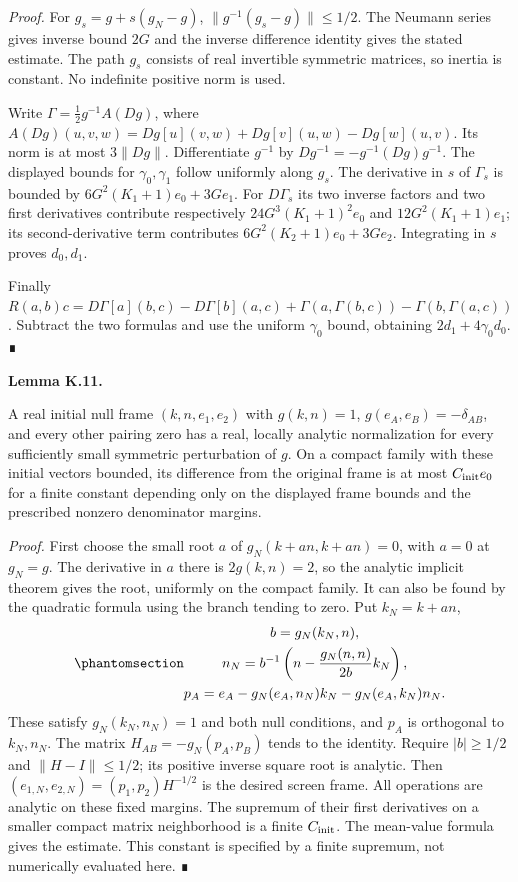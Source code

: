 \documentclass[
  english,
  11pt,
  reqno]{amsart}
\makeatletter
\newcommand{\pandocstatementheading}[1]{%
  \par\addpenalty{\@beginparpenalty}%
  \addvspace{.5\baselineskip plus .2\baselineskip minus .2\baselineskip}%
  {\normalfont\bfseries #1\par}%
  \nobreak\@afterindenttrue\@afterheading
}
\makeatother
\begin{document}
\emph{Proof.} For \(g_s=g+s(g_N-g)\), \(\|g^{-1}(g_s-g)\|\le1/2\). The
Neumann series gives inverse bound \(2G\) and the inverse difference
identity gives the stated estimate. The path \(g_s\) consists of real
invertible symmetric matrices, so inertia is constant. No indefinite
positive norm is used.

Write \(\Gamma=\tfrac12g^{-1}A(Dg)\), where
\(A(Dg)(u,v,w)=Dg[u](v,w)+Dg[v](u,w)-Dg[w](u,v)\). Its norm is at most
\(3\|Dg\|\). Differentiate \(g^{-1}\) by \(Dg^{-1}=-g^{-1}(Dg)g^{-1}\).
The displayed bounds for \(\gamma_0,\gamma_1\) follow uniformly along
\(g_s\). The derivative in \(s\) of \(\Gamma_s\) is bounded by
\(6G^2(K_1+1)e_0+3Ge_1\). For \(D\Gamma_s\) its two inverse factors and
two first derivatives contribute respectively \(24G^3(K_1+1)^2e_0\) and
\(12G^2(K_1+1)e_1\); its second-derivative term contributes
\(6G^2(K_2+1)e_0+3Ge_2\). Integrating in \(s\) proves \(d_0,d_1\).

Finally
\(R(a,b)c=D\Gamma[a](b,c)-D\Gamma[b](a,c)+\Gamma(a,\Gamma(b,c))-\Gamma(b,\Gamma(a,c))\).
Subtract the two formulas and use the uniform \(\gamma_0\) bound,
obtaining \(2d_1+4\gamma_0d_0\). ∎

\pandocstatementheading{\protect{}\label{lem:sh-null-frame-initialization}Lemma K.11.}

A real initial null frame \((k,n,e_1,e_2)\) with \(g(k,n)=1\),
\(g(e_A,e_B)=-\delta_{AB}\), and every other pairing zero has a real,
locally analytic normalization for every sufficiently small symmetric
perturbation of \(g\). On a compact family with these initial vectors
bounded, its difference from the original frame is at most
\(C_{\rm init}e_0\) for a finite constant depending only on the
displayed frame bounds and the prescribed nonzero denominator margins.

\emph{Proof.} First choose the small root \(a\) of \(g_N(k+an,k+an)=0\),
with \(a=0\) at \(g_N=g\). The derivative in \(a\) there is
\(2g(k,n)=2\), so the analytic implicit theorem gives the root,
uniformly on the compact family. It can also be found by the quadratic
formula using the branch tending to zero. Put \(k_N=k+an\),
\begin{equation}\protect\phantomsection\label{eq:sh-null-frame-normalization}{\begin{gathered}
b=g_N(k_N,n), \\
n_N=b^{-1}\left(n-\frac{g_N(n,n)}{2b}k_N\right), \\
p_A=e_A-g_N(e_A,n_N)k_N-g_N(e_A,k_N)n_N.
\end{gathered}}\end{equation} These satisfy \(g_N(k_N,n_N)=1\) and both null
conditions, and \(p_A\) is orthogonal to \(k_N,n_N\). The matrix
\(H_{AB}=-g_N(p_A,p_B)\) tends to the identity. Require \(|b|\ge1/2\)
and \(\|H-I\|\le1/2\); its positive inverse square root is analytic.
Then \((e_{1,N},e_{2,N})=(p_1,p_2)H^{-1/2}\) is the desired screen
frame. All operations are analytic on these fixed margins. The supremum
of their first derivatives on a smaller compact matrix neighborhood is a
finite \(C_{\rm init}\). The mean-value formula gives the estimate. This
constant is specified by a finite supremum, not numerically evaluated
here. ∎
\end{document}
